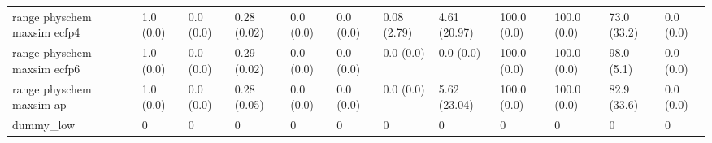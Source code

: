 \begin{tabular}{llllllllllll}
range physchem maxsim ecfp4 & {\cellcolor[HTML]{F6FCFD}} \color[HTML]{000000} 1.0 (0.0) & {\cellcolor[HTML]{F7FCFD}} \color[HTML]{000000} 0.0 (0.0) & {\cellcolor[HTML]{BFE7DE}} \color[HTML]{000000} 0.28 (0.02) & {\cellcolor[HTML]{F7FCFD}} \color[HTML]{000000} 0.0 (0.0) & {\cellcolor[HTML]{F7FCFD}} \color[HTML]{000000} 0.0 (0.0) & {\cellcolor[HTML]{F7FCFD}} \color[HTML]{000000} 0.08 (2.79) & {\cellcolor[HTML]{F1FAFC}} \color[HTML]{000000} 4.61 (20.97) & {\cellcolor[HTML]{00441B}} \color[HTML]{F1F1F1} 100.0 (0.0) & {\cellcolor[HTML]{00441B}} \color[HTML]{F1F1F1} 100.0 (0.0) & {\cellcolor[HTML]{28914D}} \color[HTML]{F1F1F1} 73.0 (33.2) & {\cellcolor[HTML]{F7FCFD}} \color[HTML]{000000} 0.0 (0.0) \\
range physchem maxsim ecfp6 & {\cellcolor[HTML]{F6FCFD}} \color[HTML]{000000} 1.0 (0.0) & {\cellcolor[HTML]{F7FCFD}} \color[HTML]{000000} 0.0 (0.0) & {\cellcolor[HTML]{BDE6DE}} \color[HTML]{000000} 0.29 (0.02) & {\cellcolor[HTML]{F7FCFD}} \color[HTML]{000000} 0.0 (0.0) & {\cellcolor[HTML]{F7FCFD}} \color[HTML]{000000} 0.0 (0.0) & {\cellcolor[HTML]{F7FCFD}} \color[HTML]{000000} 0.0 (0.0) & {\cellcolor[HTML]{F7FCFD}} \color[HTML]{000000} 0.0 (0.0) & {\cellcolor[HTML]{00441B}} \color[HTML]{F1F1F1} 100.0 (0.0) & {\cellcolor[HTML]{00441B}} \color[HTML]{F1F1F1} 100.0 (0.0) & {\cellcolor[HTML]{00491D}} \color[HTML]{F1F1F1} 98.0 (5.1) & {\cellcolor[HTML]{F7FCFD}} \color[HTML]{000000} 0.0 (0.0) \\
range physchem maxsim ap & {\cellcolor[HTML]{F6FCFD}} \color[HTML]{000000} 1.0 (0.0) & {\cellcolor[HTML]{F7FCFD}} \color[HTML]{000000} 0.0 (0.0) & {\cellcolor[HTML]{BFE7DE}} \color[HTML]{000000} 0.28 (0.05) & {\cellcolor[HTML]{F7FCFD}} \color[HTML]{000000} 0.0 (0.0) & {\cellcolor[HTML]{F7FCFD}} \color[HTML]{000000} 0.0 (0.0) & {\cellcolor[HTML]{F7FCFD}} \color[HTML]{000000} 0.0 (0.0) & {\cellcolor[HTML]{EFF9FB}} \color[HTML]{000000} 5.62 (23.04) & {\cellcolor[HTML]{00441B}} \color[HTML]{F1F1F1} 100.0 (0.0) & {\cellcolor[HTML]{00441B}} \color[HTML]{F1F1F1} 100.0 (0.0) & {\cellcolor[HTML]{0C7735}} \color[HTML]{F1F1F1} 82.9 (33.6) & {\cellcolor[HTML]{F7FCFD}} \color[HTML]{000000} 0.0 (0.0) \\
dummy_low & {\cellcolor[HTML]{F7FCFD}} \color[HTML]{000000} 0 & {\cellcolor[HTML]{F7FCFD}} \color[HTML]{000000} 0 & {\cellcolor[HTML]{F7FCFD}} \color[HTML]{000000} 0 & {\cellcolor[HTML]{F7FCFD}} \color[HTML]{000000} 0 & {\cellcolor[HTML]{F7FCFD}} \color[HTML]{000000} 0 & {\cellcolor[HTML]{F7FCFD}} \color[HTML]{000000} 0 & {\cellcolor[HTML]{F7FCFD}} \color[HTML]{000000} 0 & {\cellcolor[HTML]{F7FCFD}} \color[HTML]{000000} 0 & {\cellcolor[HTML]{F7FCFD}} \color[HTML]{000000} 0 & {\cellcolor[HTML]{F7FCFD}} \color[HTML]{000000} 0 & {\cellcolor[HTML]{F7FCFD}} \color[HTML]{000000} 0 \\

\end{tabular}
